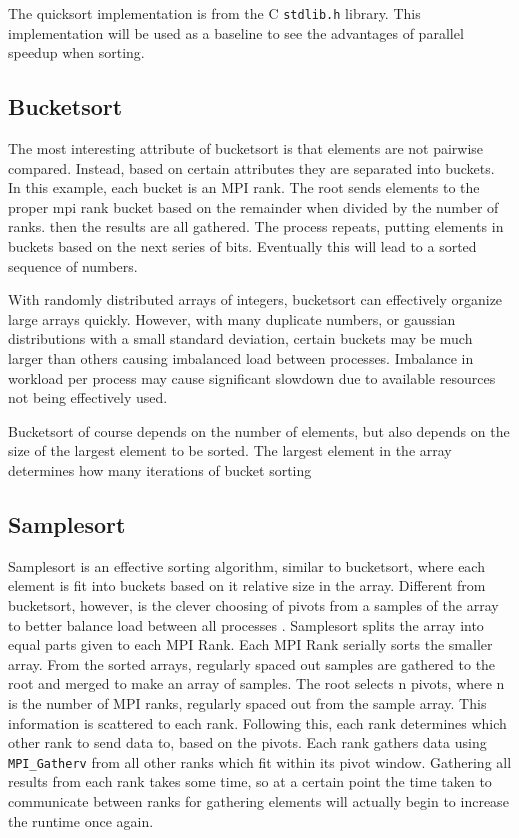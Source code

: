 \documentclass[10pt,letterpaper]{article}
\begin{document}
\begin{multicols}{2}
The quicksort implementation is from the C \texttt{stdlib.h} library. This implementation will be used as a baseline to see the advantages of parallel speedup when sorting.
\subsection{Bucketsort}
The most interesting attribute of bucketsort is that elements are not pairwise compared. Instead, based on certain attributes they are separated into buckets. In this example, each bucket is an MPI rank. The root sends elements to the proper mpi rank bucket based on the remainder when divided by the number of ranks. then the results are all gathered. The process repeats, putting elements in buckets based on the next series of bits. Eventually this will lead to a sorted sequence of numbers.

With randomly distributed arrays of integers, bucketsort can effectively organize large arrays quickly. However, with many duplicate numbers, or gaussian distributions with a small standard deviation, certain buckets may be much larger than others causing imbalanced load between processes. Imbalance in workload per process may cause significant slowdown due to available resources not being effectively used.

Bucketsort of course depends on the number of elements, but also depends on the size of the largest element to be sorted. The largest element in the array determines how many iterations of bucket sorting 
\subsection{Samplesort}
Samplesort is an effective sorting algorithm, similar to bucketsort, where each element is fit into buckets based on it relative size in the array. Different from bucketsort, however, is the clever choosing of pivots from a samples of the array to better balance load between all processes
\cite{samplesort}. Samplesort splits the array into equal parts given to each MPI Rank. Each MPI Rank serially sorts the smaller array. From the sorted arrays, regularly spaced out samples are gathered to the root and merged to make an array of samples. The root selects n pivots, where n is the number of MPI ranks, regularly spaced out from the sample array. This information is scattered to each rank. Following this, each rank determines which other rank to send data to, based on the pivots. Each rank gathers data using \texttt{MPI\_Gatherv} from all other ranks which fit within its pivot window. Gathering all results from each rank takes some time, so at a certain point the time taken to communicate between ranks for gathering elements will actually begin to increase the runtime once again.


\end{multicols}
\end{document}
